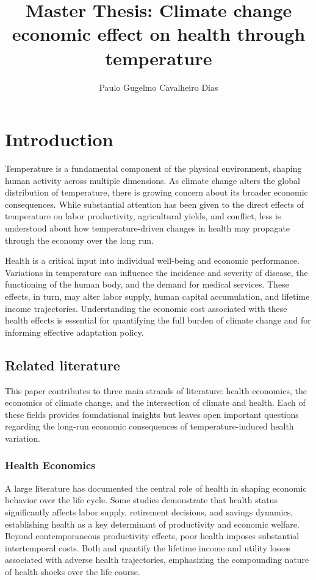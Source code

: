 \documentclass{article}
\author{Paulo Gugelmo Cavalheiro Dias}
\title{Master Thesis: Climate change economic effect on health through temperature}
\begin{document}
\maketitle

\newpage
\tableofcontents

\newpage
\section{Introduction}
Temperature is a fundamental component of the
physical environment, shaping human activity
across multiple dimensions. As climate change
alters the global distribution of temperature,
there is growing concern about its broader
economic consequences. While substantial
attention has been given to the direct effects
of temperature on labor productivity,
agricultural yields, and conflict, less
is understood about how temperature-driven
changes in health may propagate through the
economy over the long run.

Health is a critical input into individual
well-being and economic performance.
Variations in temperature can influence
the incidence and severity of disease,
the functioning of the human body, and
the demand for medical services. These
effects, in turn, may alter labor supply,
human capital accumulation, and lifetime
income trajectories. Understanding the
economic cost associated with these health
effects is essential for quantifying the
full burden of climate change and for
informing effective adaptation policy.

\subsection{Related literature}

This paper contributes to three main strands of literature: health economics, the economics of climate change, and the intersection of climate and health. Each of these fields provides foundational insights but leaves open important questions regarding the long-run economic consequences of temperature-induced health variation.

\subsubsection{Health Economics}

A large literature has documented the central role of health
in shaping economic behavior over the life cycle.
Some studies \citep{DeNardi2023} demonstrate that health status
significantly affects labor supply, retirement decisions,
and savings dynamics, establishing health as a key determinant
of productivity and economic welfare.
Beyond contemporaneous productivity effects,
poor health imposes substantial intertemporal costs.
Both \citep{DeNardi2023} and \citep{Capatina_2015} quantify
the lifetime income and utility losses associated with
adverse health trajectories, emphasizing the compounding
nature of health shocks over the life course.
\end{document}
